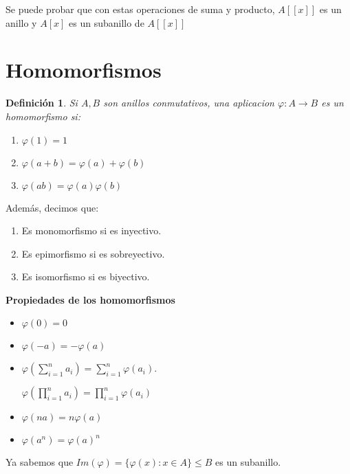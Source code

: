 \documentclass[11pt, a4paper, titlepage]{article}
\theoremstyle{theorem-style}
\theoremstyle{definition-style}
\newtheorem*{ndef}{Definición}
\theoremstyle{remark-style}
\theoremstyle{example-style}
\begin{document}
Se puede probar que con estas operaciones de suma y producto, $A[[x]]$ es un anillo y $A[x]$ es un subanillo de $A[[x]]$  

\section{Homomorfismos}

\begin{ndef}
Si $A,B$ son anillos conmutativos, una aplicacion $\varphi: A \to B$ es un homomorfismo si:

\begin{enumerate}
	\item $\varphi(1) = 1$
	\item $\varphi(a+b) = \varphi(a) + \varphi(b)$
	\item $\varphi(ab) = \varphi(a)  \varphi(b)$
	
\end{enumerate}
	
\end{ndef}

Además, decimos que:

\begin{enumerate}
	\item Es monomorfismo si es inyectivo.
	\item Es epimorfismo si es sobreyectivo.
	\item Es isomorfismo si es biyectivo.
\end{enumerate}

\textbf{Propiedades de los homomorfismos}

\begin{itemize}

\item $\varphi(0) = 0$

\item $\varphi(-a) = -\varphi(a) $

\item $\varphi(\sum_{i = 1}^n a_i) = \sum_{i = 1}^n\varphi(a_i)$. 

$\varphi(\prod_{i = 1}^n a_i) = \prod_{i = 1}^n\varphi(a_i)$

\item $\varphi(na) = n\varphi(a)$

\item $\varphi(a^n) = \varphi(a)^n$
	
\end{itemize}


Ya sabemos que $Im(\varphi) = \{ \varphi(x): x \in A\} \leq B$ es un subanillo.
\end{document}
